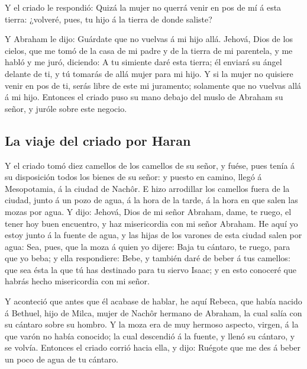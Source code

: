  Y el criado le respondió: Quizá la mujer no querrá venir
en pos de mí á esta tierra: ¿volveré, pues, tu hijo á la tierra de donde
saliste?

 Y Abraham le dijo: Guárdate que no vuelvas á mi hijo
allá.  Jehová, Dios de los cielos, que me tomó de la casa
de mi padre y de la tierra de mi parentela, y me habló y me juró,
diciendo: A tu simiente daré esta tierra; él enviará su ángel delante de
ti, y tú tomarás de allá mujer para mi hijo.  Y si la
mujer no quisiere venir en pos de ti, serás libre de este mi juramento;
solamente que no vuelvas allá á mi hijo.  Entonces el
criado puso su mano debajo del muslo de Abraham su señor, y juróle sobre
este negocio.

\hypertarget{la-viaje-del-criado-por-haran}{%
\subsection{La viaje del criado por
Haran}\label{la-viaje-del-criado-por-haran}}

 Y el criado tomó diez camellos de los camellos de su
señor, y fuése, pues tenía á su disposición todos los bienes de su
señor: y puesto en camino, llegó á Mesopotamia, á la ciudad de Nachôr.
 E hizo arrodillar los camellos fuera de la ciudad, junto
á un pozo de agua, á la hora de la tarde, á la hora en que salen las
mozas por agua.  Y dijo: Jehová, Dios de mi señor
Abraham, dame, te ruego, el tener hoy buen encuentro, y haz misericordia
con mi señor Abraham.  He aquí yo estoy junto á la fuente
de agua, y las hijas de los varones de esta ciudad salen por agua:
 Sea, pues, que la moza á quien yo dijere: Baja tu
cántaro, te ruego, para que yo beba; y ella respondiere: Bebe, y también
daré de beber á tus camellos: que sea ésta la que tú has destinado para
tu siervo Isaac; y en esto conoceré que habrás hecho misericordia con mi
señor.

 Y aconteció que antes que él acabase de hablar, he aquí
Rebeca, que había nacido á Bethuel, hijo de Milca, mujer de Nachôr
hermano de Abraham, la cual salía con su cántaro sobre su hombro.
 Y la moza era de muy hermoso aspecto, virgen, á la que
varón no había conocido; la cual descendió á la fuente, y llenó su
cántaro, y se volvía.  Entonces el criado corrió hacia
ella, y dijo: Ruégote que me des á beber un poco de agua de tu cántaro.

